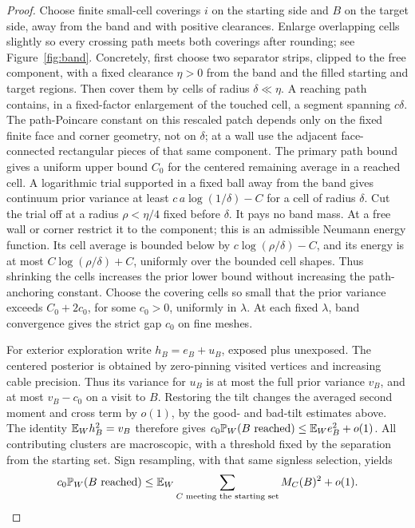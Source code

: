 \begin{proof}
Choose finite small-cell coverings \(i\) on the starting
side and \(B\) on the target side, away from the band and
with positive clearances. Enlarge overlapping cells slightly
so every crossing path meets both coverings after rounding;
see Figure~\ref{fig:band}.
Concretely, first choose two separator strips, clipped to
the free component, with a fixed clearance \(\eta>0\) from
the band and the filled starting and target regions.
Then cover them by cells of radius \(\delta\ll\eta\).
A reaching path contains, in a fixed-factor enlargement
of the touched cell, a segment spanning \(c\delta\).
The path-Poincare constant on this rescaled patch depends
only on the fixed finite face and corner geometry, not on
\(\delta\); at a wall use the adjacent face-connected
rectangular pieces of that same component.
The primary path bound gives a uniform upper bound \(C_0\)
for the centered remaining average in a reached cell.
A logarithmic trial supported in a fixed ball away from
the band gives continuum prior variance at least
\(c\,a\log(1/\delta)-C\) for a cell of radius \(\delta\).
Cut the trial off at a radius \(\rho<\eta/4\) fixed before
\(\delta\). It pays no band mass. At a free wall or corner
restrict it to the component; this is an admissible Neumann
energy function. Its cell average is bounded below by
\(c\log(\rho/\delta)-C\), and its energy is at most
\(C\log(\rho/\delta)+C\), uniformly over the bounded cell
shapes. Thus shrinking the cells increases the prior lower
bound without increasing the path-anchoring constant.
Choose the covering cells so small that the prior variance
exceeds \(C_0+2c_0\), for some \(c_0>0\), uniformly in
\(\lambda\). At each fixed \(\lambda\), band convergence
gives the strict gap \(c_0\) on fine meshes.

For exterior exploration write \(h_B=e_B+u_B\), exposed
plus unexposed. The centered posterior is obtained by
zero-pinning visited vertices and increasing cable
precision. Thus its variance for \(u_B\) is at most
the full prior variance \(v_B\), and at most \(v_B-c_0\)
on a visit to \(B\). Restoring the tilt changes the
averaged second moment and cross term by \(o(1)\), by
the good- and bad-tilt estimates above. The identity
\(\mathbb E_Wh_B^2=v_B\) therefore gives
\(c_0\mathbb P_W(B\text{ reached})\le\mathbb E_We_B^2+o(1)\).
All contributing clusters are macroscopic, with a
threshold fixed by the separation from the starting set.
Sign resampling, with that same signless selection, yields
\begin{equation}
 c_0\mathbb P_W(B\text{ reached})
 \le\mathbb E_W\sum_{C\text{ meeting the starting set}}M_C(B)^2+o(1).
 \label{eq:pins-exterior-deficit}
\end{equation}


\end{proof}
